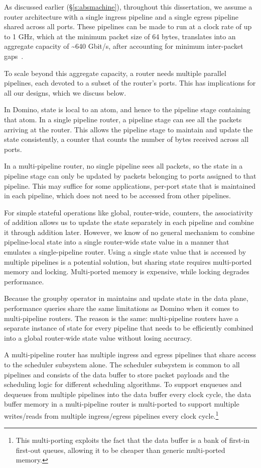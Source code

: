 As discussed earlier (\S\ref{s:absmachine}), throughout this dissertation, we
assume a router architecture with a single ingress pipeline and a single egress
pipeline shared across all ports. These pipelines can be made to run at a clock
rate of up to 1 GHz, which at the minimum packet size of 64 bytes, translates
into an aggregate capacity of \textasciitilde640 Gbit/s, after accounting for
minimum inter-packet gaps~\cite{rmt}.

To scale beyond this aggregate capacity, a router needs multiple parallel
pipelines, each devoted to a subset of the router's ports. This has
implications for all our designs, which we discuss below.

 In Domino, state is local to an atom, and hence to the pipeline
stage containing that atom.  In a single pipeline router, a pipeline stage can
see all the packets arriving at the router. This allows the pipeline stage to
maintain and update the state consistently, \eg a counter that counts the
number of bytes received across all ports.

In a multi-pipeline router, no single pipeline sees all packets, so the state
in a pipeline stage can only be updated by packets belonging to ports assigned
to that pipeline. This may suffice for some applications, \eg per-port state
that is maintained in each pipeline, which does not need to be accessed from
other pipelines. 

For simple stateful operations like global, router-wide, counters, the
associativity of addition allows us to update the state separately in each
pipeline and combine it through addition later. However, we know of no general
mechanism to combine pipeline-local state into a single router-wide state value
in a manner that emulates a single-pipeline router. Using a single state value
that is accessed by multiple pipelines is a potential solution, but sharing
state requires multi-ported memory and locking. Multi-ported memory is
expensive, while locking degrades performance.

 Because the {\ct groupby} operator in \TheSystem
maintains and update state in the data plane, performance queries share the
same limitations as Domino when it comes to multi-pipeline routers. The reason
is the same: multi-pipeline routers have a separate instance of state for every
pipeline that needs to be efficiently combined into a global router-wide state
value without losing accuracy.

 A multi-pipeline router has multiple ingress and egress pipelines
that share access to the scheduler subsystem alone. The scheduler subsystem is
common to all pipelines and consists of the data buffer to store packet
payloads and the scheduling logic for different scheduling algorithms. To
support enqueues and dequeues from multiple pipelines into the data buffer
every clock cycle, the data buffer memory in a multi-pipeline router is
multi-ported to support multiple writes/reads from multiple ingress/egress
pipelines every clock cycle.\footnote{This multi-porting exploits the fact that
the data buffer is a bank of first-in first-out queues, allowing it to be
cheaper than generic multi-ported memory.}

